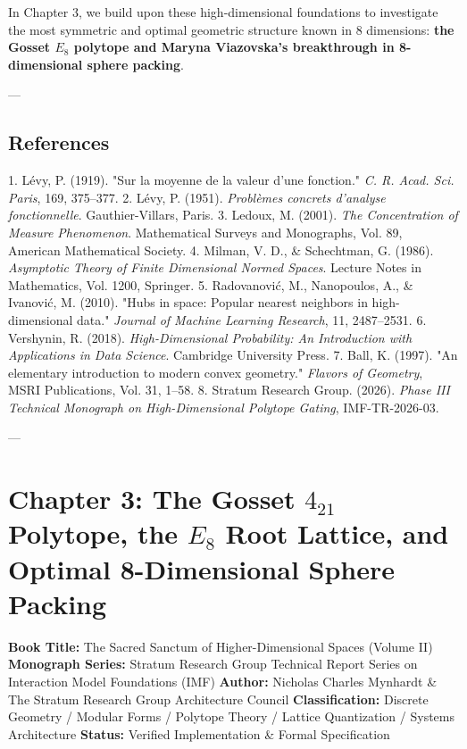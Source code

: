 \documentclass[11pt,twoside,openright]{amsbook}
\begin{document}
In Chapter 3, we build upon these high-dimensional foundations to investigate the most symmetric and optimal geometric structure known in 8 dimensions: \textbf{the Gosset $E_8$ polytope and Maryna Viazovska's breakthrough in 8-dimensional sphere packing}.

---

\section{References}

1. Lévy, P. (1919). "Sur la moyenne de la valeur d'une fonction." \textit{C. R. Acad. Sci. Paris}, 169, 375–377.
2. Lévy, P. (1951). \textit{Problèmes concrets d'analyse fonctionnelle}. Gauthier-Villars, Paris.
3. Ledoux, M. (2001). \textit{The Concentration of Measure Phenomenon}. Mathematical Surveys and Monographs, Vol. 89, American Mathematical Society.
4. Milman, V. D., & Schechtman, G. (1986). \textit{Asymptotic Theory of Finite Dimensional Normed Spaces}. Lecture Notes in Mathematics, Vol. 1200, Springer.
5. Radovanović, M., Nanopoulos, A., & Ivanović, M. (2010). "Hubs in space: Popular nearest neighbors in high-dimensional data." \textit{Journal of Machine Learning Research}, 11, 2487–2531.
6. Vershynin, R. (2018). \textit{High-Dimensional Probability: An Introduction with Applications in Data Science}. Cambridge University Press.
7. Ball, K. (1997). "An elementary introduction to modern convex geometry." \textit{Flavors of Geometry}, MSRI Publications, Vol. 31, 1–58.
8. Stratum Research Group. (2026). \textit{Phase III Technical Monograph on High-Dimensional Polytope Gating}, IMF-TR-2026-03.


---

\chapter{Chapter 3: The Gosset $4_{21}$ Polytope, the $E_8$ Root Lattice, and Optimal 8-Dimensional Sphere Packing}

\textbf{Book Title:} The Sacred Sanctum of Higher-Dimensional Spaces (Volume II)  
\textbf{Monograph Series:} Stratum Research Group Technical Report Series on Interaction Model Foundations (IMF)  
\textbf{Author:} Nicholas Charles Mynhardt & The Stratum Research Group Architecture Council  
\textbf{Classification:} Discrete Geometry / Modular Forms / Polytope Theory / Lattice Quantization / Systems Architecture  
\textbf{Status:} Verified Implementation & Formal Specification  
\end{document}
